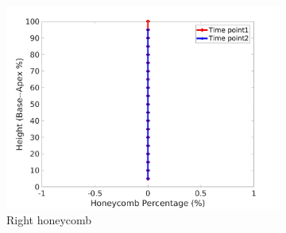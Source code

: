 \begin{figure}[H]
\begin{subfigure}{.42\linewidth}
  \includegraphics[width=\linewidth,trim={{.0\wd0} {.0\wd0} {.0\wd0} {.0\wd0}},clip]{Appendix/Image_AppexA/BaseToApex/IPF10RightLungHoneycombDiseaseAgainstHeight.jpg}
  \caption{Right honeycomb}
  \label{fig:IPF10DiseaseAgainstHeight-f}
\end{subfigure}
\begin{subfigure}{.42\linewidth}%

\end{subfigure}
\end{figure}
